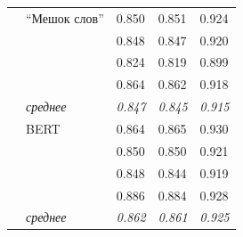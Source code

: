 \begin{table}[H]
\begin{center}
\begin{tabular}{|p{3cm}|p{4cm}|p{2.4cm}|p{2.4cm}|p{2.4cm}|}
			& ``Мешок слов'' & 0.850 & 0.851 & 0.924 \\
				& & 0.848 & 0.847 & 0.920 \\
				& & 0.824 & 0.819 & 0.899 \\
				& & 0.864 & 0.862 & 0.918 \\
				 & \textit{среднее} & \textit{0.847} & \textit{0.845} & \textit{0.915} \\
			& BERT & 0.864 & 0.865 & 0.930 \\
				& & 0.850 & 0.850 & 0.921 \\
				& & 0.848 & 0.844 & 0.919 \\
				& & 0.886 & 0.884 & 0.928 \\
				 & \textit{среднее} & \textit{0.862} & \textit{0.861} & \textit{0.925} \\
					
			\hline
		\end{tabular}
	\end{center}
\end{table}

